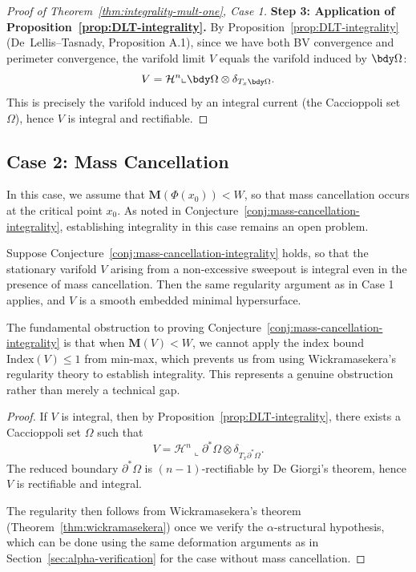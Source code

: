 \begin{proof}[Proof of Theorem~\ref{thm:integrality-mult-one}, Case 1]
\textbf{Step 3: Application of Proposition~\ref{prop:DLT-integrality}.} By
Proposition~\ref{prop:DLT-integrality} (De~Lellis--Tasnady, Proposition A.1), since we have both
BV convergence and perimeter convergence, the varifold limit $V$ equals the varifold induced by
$\bdy\Omega$:
\[
    V = \mathcal{H}^n \llcorner \bdy\Omega \otimes \delta_{T_x\bdy\Omega}.
\]
This is precisely the varifold induced by an integral current (the Caccioppoli set $\Omega$), hence
$V$ is integral and rectifiable.
\end{proof}

\subsection{Case 2: Mass Cancellation}

In this case, we assume that $\mathbf{M}(\Phi(x_0)) < W$, so that mass cancellation occurs at the critical point $x_0$. As noted in Conjecture~\ref{conj:mass-cancellation-integrality}, establishing integrality in this case remains an open problem.

\begin{proposition}\label{prop:regularity-with-cancellation}
    Suppose Conjecture~\ref{conj:mass-cancellation-integrality} holds, so that the stationary varifold $V$ arising from a non-excessive sweepout is integral even in the presence of mass cancellation. Then the same regularity argument as in Case 1 applies, and $V$ is a smooth embedded minimal hypersurface.
\end{proposition}

\begin{remark}
The fundamental obstruction to proving Conjecture~\ref{conj:mass-cancellation-integrality} is that when $\mathbf{M}(V) < W$, we cannot apply the index bound $\mathrm{Index}(V) \leq 1$ from min-max, which prevents us from using Wickramasekera's regularity theory to establish integrality. This represents a genuine obstruction rather than merely a technical gap.
\end{remark}

\begin{proof}
If $V$ is integral, then by Proposition~\ref{prop:DLT-integrality}, there exists a Caccioppoli set $\Omega$ such that
\[
    V = \mathcal{H}^n \llcorner \partial^*\Omega \otimes \delta_{T_x\partial^*\Omega}.
\]
The reduced boundary $\partial^*\Omega$ is $(n-1)$-rectifiable by De Giorgi's theorem, hence $V$ is rectifiable and integral.

The regularity then follows from Wickramasekera's theorem (Theorem~\ref{thm:wickramasekera}) once we verify the $\alpha$-structural hypothesis, which can be done using the same deformation arguments as in Section~\ref{sec:alpha-verification} for the case without mass cancellation.
\end{proof}


